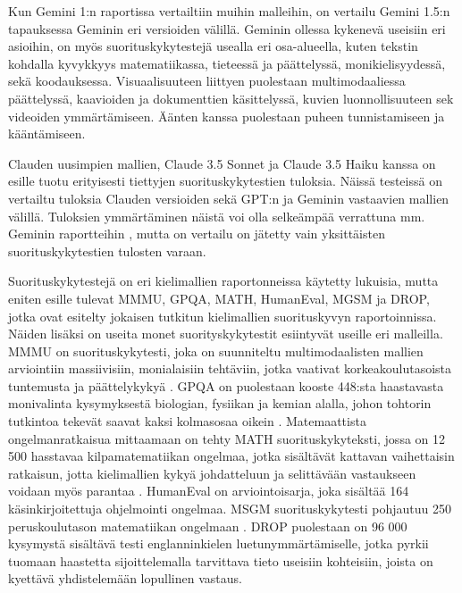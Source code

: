 Kun Gemini 1:n raportissa \parencite{googleDeepmindGeminiv1report} vertailtiin
muihin malleihin, on vertailu Gemini 1.5:n
\parencite{googleDeepmindGeminiv1report} tapauksessa Geminin eri versioiden
välillä. Geminin ollessa kykenevä useisiin eri asioihin, on myös
suorituskykytestejä usealla eri osa-alueella, kuten tekstin kohdalla
kyvykkyys matematiikassa, tieteessä ja päättelyssä, monikielisyydessä,
sekä koodauksessa. Visuaalisuuteen liittyen puolestaan multimodaaliessa
päättelyssä, kaavioiden ja dokumenttien käsittelyssä, kuvien luonnollisuuteen
sek videoiden ymmärtämiseen. Äänten kanssa puolestaan puheen tunnistamiseen ja
kääntämiseen.

Clauden uusimpien mallien, Claude 3.5 Sonnet ja Claude 3.5 Haiku kanssa on
esille tuotu erityisesti tiettyjen suorituskykytestien tuloksia. Näissä
testeissä on vertailtu tuloksia Clauden versioiden sekä GPT:n ja Geminin
vastaavien mallien välillä. \parencite{anthropicClaudeSonnetAndHaiku35}
\parencite{anthropicClaudeSonnet} \parencite{anthropicClaudeHaiku} Tuloksien
ymmärtäminen näistä voi olla selkeämpää verrattuna mm. Geminin raportteihin
\parencite{googleDeepmindGeminiv1report}
\parencite{googleDeepmindGeminiv1_5report}, mutta on vertailu on jätetty vain
yksittäisten suorituskykytestien tulosten varaan.

Suorituskykytestejä on eri kielimallien raportonneissa
\parencite{anthropicClaudeSonnetAndHaiku35} \parencite{openAI2023GPT4}
\parencite{openAIGPT4o} \parencite{googleDeepmindGeminiv1_5report} käytetty
lukuisia, mutta eniten esille tulevat MMMU, GPQA, MATH, HumanEval, MGSM ja
DROP, jotka ovat esitelty jokaisen tutkitun kielimallien suorituskyvyn
raportoinnissa. Näiden lisäksi on useita monet suorityskykytestit esiintyvät
useille eri malleilla. MMMU on suorituskykytesti, joka on suunniteltu
multimodaalisten mallien arviointiin massiivisiin, monialaisiin tehtäviin,
jotka vaativat korkeakoulutasoista tuntemusta ja päättelykykyä
\parencite{benchmarkMMMU}. GPQA on puolestaan kooste 448:sta haastavasta
monivalinta kysymyksestä biologian, fysiikan ja kemian alalla, johon tohtorin
tutkintoa tekevät saavat kaksi kolmasosaa oikein \parencite{benchmarkGPQA}.
Matemaattista ongelmanratkaisua mittaamaan on tehty MATH suorituskykyteksti,
jossa on 12 500 hasstavaa kilpamatematiikan ongelmaa, jotka sisältävät
kattavan vaihettaisin ratkaisun, jotta kielimallien kykyä johdatteluun ja
selittävään vastaukseen voidaan myös parantaa \parencite{benchmarkMATH}.
HumanEval \parencite{benchmarkHumanEval} on arviointoisarja, joka sisältää
164 käsinkirjoitettuja ohjelmointi ongelmaa. MSGM suorituskykytesti
pohjautuu 250 peruskoulutason matematiikan ongelmaan \parencite{benchmarkMSGM}.
DROP puolestaan on 96 000 kysymystä sisältävä testi englanninkielen
luetunymmärtämiselle, jotka pyrkii tuomaan haastetta sijoittelemalla
tarvittava tieto useisiin kohteisiin, joista on kyettävä yhdistelemään
lopullinen vastaus.

